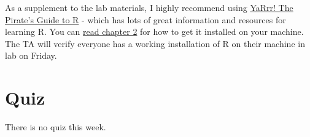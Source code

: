 \documentclass[
]{book}
\begin{document}
As a supplement to the lab materials, I highly recommend using \href{https://bookdown.org/ndphillips/YaRrr/}{YaRrr! The Pirate's Guide to R} - which has lots of great information and resources for learning R. You can \href{https://bookdown.org/ndphillips/YaRrr/installing-base-r-and-rstudio.html}{read chapter 2} for how to get it installed on your machine. The TA will verify everyone has a working installation of R on their machine in lab on Friday.

\hypertarget{quiz}{%
\section{Quiz}\label{quiz}}

There is no quiz this week.
\end{document}
